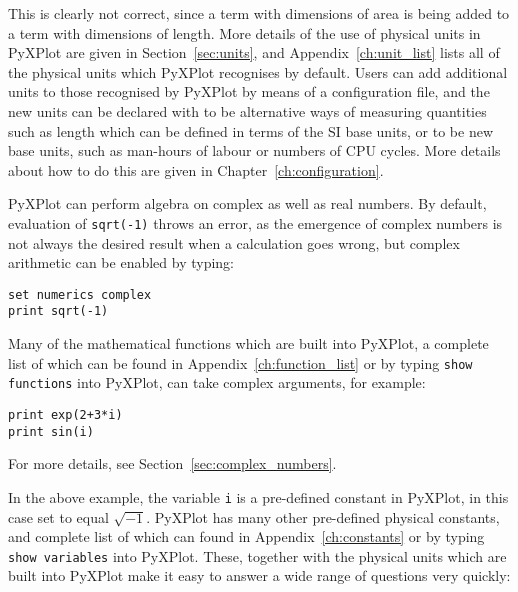 \noindent This is clearly not correct, since a term with dimensions of area is
being added to a term with dimensions of length. More details of the use of
physical units in PyXPlot are given in Section~\ref{sec:units}, and
Appendix~\ref{ch:unit_list} lists all of the physical units which PyXPlot
recognises by default. Users can add additional units to those recognised by
PyXPlot by means of a configuration file, and the new units can be declared
with to be alternative ways of measuring quantities such as length which can be
defined in terms of the SI base units, or to be new base units, such as
man-hours of labour or numbers of CPU cycles.  More details about how to do
this are given in Chapter~\ref{ch:configuration}.

PyXPlot can perform algebra on complex as well as real numbers. By default,
evaluation of {\tt sqrt(-1)} throws an error, as the emergence of complex
numbers is not always the desired result when a calculation goes wrong, but
complex arithmetic can be enabled by typing:

\begin{verbatim}
set numerics complex
print sqrt(-1)
\end{verbatim}

\noindent Many of the mathematical functions which are built into PyXPlot, a
complete list of which can be found in Appendix~\ref{ch:function_list} or by
typing {\tt show functions} into PyXPlot, can take complex arguments, for
example:

\begin{verbatim}
print exp(2+3*i)
print sin(i)
\end{verbatim}

\noindent For more details, see Section~\ref{sec:complex_numbers}.

In the above example, the variable {\tt i} is a pre-defined constant in
PyXPlot, in this case set to equal $\sqrt{-1}$. PyXPlot has many other
pre-defined physical constants, and complete list of which can found in
Appendix~\ref{ch:constants} or by typing {\tt show variables} into PyXPlot.
These, together with the physical units which are built into PyXPlot make it
easy to answer a wide range of questions very quickly:

